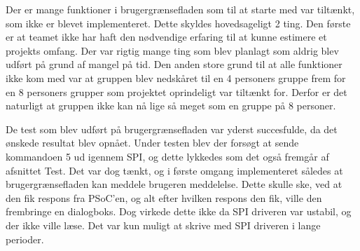 
Der er mange funktioner i brugergrænsefladen som til at starte med var tiltænkt, som ikke er blevet implementeret. Dette skyldes hovedsageligt 2 ting. Den første er at teamet ikke har haft den nødvendige erfaring til at kunne estimere et projekts omfang. Der var rigtig mange ting som blev planlagt som aldrig blev udført på grund af mangel på tid. Den anden store grund til at alle funktioner ikke kom med var at gruppen blev nedskåret til en 4 personers gruppe frem for en 8 personers grupper som projektet oprindeligt var tiltænkt for. Derfor er det naturligt at gruppen ikke kan nå lige så meget som en gruppe på 8 personer.

De test som blev udført på brugergrænsefladen var yderst succesfulde, da det ønskede resultat blev opnået. Under testen blev der forsøgt at sende kommandoen 5 ud igennem SPI, og dette lykkedes som det også fremgår af afsnittet Test.  Det var dog tænkt, og i første omgang implementeret således at brugergrænsefladen kan meddele brugeren meddelelse. Dette skulle ske, ved at den fik respons fra PSoC’en, og alt efter hvilken respons den fik, ville den frembringe en dialogboks. Dog virkede dette ikke da SPI driveren var ustabil, og der ikke ville læse. Det var kun muligt at skrive med SPI driveren i lange perioder.

